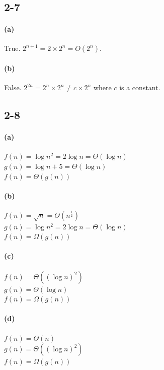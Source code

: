 \documentclass[letter]{article}
\begin{document}
\newpage
\section{}
\subsection*{2-7}
\paragraph*{(a)}
True. $2^{n+1} = 2\times 2^n = O(2^n)$.
\paragraph*{(b)}
False. $2^{2n} = 2^n\times 2^n \neq c\times 2^n$ where $c$ is a constant.

\subsection*{2-8}
\paragraph*{(a)}
$f(n) = \log n^2 = 2 \log n = \Theta (\log n)$\\
$g(n) = \log n + 5= \Theta(\log n)$\\
$f(n) = \Theta(g(n))$

\paragraph*{(b)}
$f(n) = \sqrt{n} = \Theta(n^\frac{1}{2})$\\
$g(n) = \log n^2 = 2 \log n = \Theta(\log n)$\\
$f(n) = \Omega(g(n))$\\

\paragraph*{(c)}
$f(n) = \Theta((\log n)^2)$\\
$g(n) = \Theta(\log n)$\\
$f(n) = \Omega(g(n))$

\paragraph*{(d)}
$f(n) = \Theta(n)$\\
$g(n) = \Theta((\log n)^2)$\\
$f(n) = \Omega(g(n))$
\end{document}

